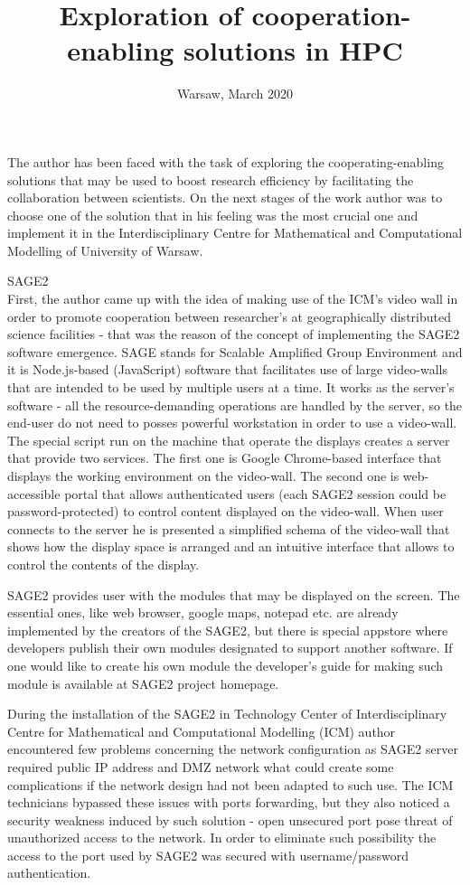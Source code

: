 \documentclass[magisterska,en]{pracamgr}
\title{Exploration of cooperation-enabling solutions in HPC}
\date{Warsaw, March 2020}
\begin{document}
\maketitle
\thispagestyle{empty}

The author has been faced with the task of exploring the cooperating-enabling solutions that may be used to boost research efficiency by facilitating the collaboration between scientists. On the next stages of the work author was to choose one of the solution that in his feeling was the most crucial one and implement it in the Interdisciplinary Centre for Mathematical and Computational Modelling of University of Warsaw.

 \noindent SAGE2\\
 First, the author came up with the idea of making use of the ICM's video wall in order to promote cooperation between researcher's at geographically distributed science facilities - that was the reason of the concept of implementing the SAGE2 software emergence.
 SAGE stands for Scalable Amplified Group Environment and it is Node.js-based (JavaScript) software that facilitates use of large video-walls that are intended to be used by multiple users at a time. It works as the server's software - all the resource-demanding operations are handled by the server, so the end-user do not need to posses powerful workstation in order to use a
 video-wall. The special script run on the machine that operate the displays creates a server that provide two services. The first one is Google Chrome-based interface that displays the working environment on the video-wall. The second one is web-accessible portal that allows authenticated users (each SAGE2 session could be password-protected) to control content displayed on the video-wall. When user connects to the server he is presented a simplified schema of the video-wall that shows how the display space is arranged and an intuitive interface that allows to control the contents of the display. \cite{SAGE2_developers}
 
 
 SAGE2 provides user with the modules that may be displayed on the screen. The essential ones, like web browser, google maps, notepad etc. are already implemented by the creators of the SAGE2, but there is special appstore where developers publish their own modules designated to support another software. If one would like to create his own module the developer's guide for making such module is available at SAGE2 project homepage.
 
 During the installation of the SAGE2 in Technology Center of Interdisciplinary Centre for Mathematical and Computational Modelling (ICM) author encountered few problems concerning the network configuration as SAGE2 server required public IP address and DMZ network what could create some complications if the network design had not been adapted to such use. The ICM technicians bypassed these issues with ports forwarding, but they also noticed a security weakness induced by such solution - open unsecured port pose threat of unauthorized access to the network. In order to eliminate such possibility the access to the port used by SAGE2 was secured with username/password authentication. 
 
\end{document}

